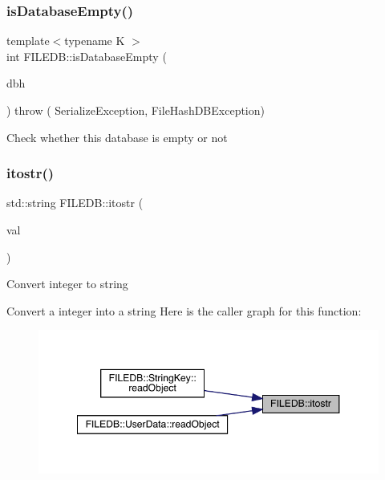 \subsubsection{\texorpdfstring{isDatabaseEmpty()}{isDatabaseEmpty()}}
{\footnotesize\ttfamily template$<$typename K $>$ \\
int F\+I\+L\+E\+D\+B\+::is\+Database\+Empty (\begin{DoxyParamCaption}\item[{\mbox{\hyperlink{adat-devel_2other__libs_2filedb_2filehash_2ffdb__db_8h_a0b27b956926453a7a8141ea8e10f0df8}{F\+F\+D\+B\+\_\+\+DB}} $\ast$}]{dbh }\end{DoxyParamCaption}) throw ( Serialize\+Exception, File\+Hash\+D\+B\+Exception) }

Check whether this database is empty or not \mbox{\label{namespaceFILEDB_a00ba2326eea8f8eb8dc3b4be5eac2bf3}} 
\subsubsection{\texorpdfstring{itostr()}{itostr()}}
{\footnotesize\ttfamily std\+::string F\+I\+L\+E\+D\+B\+::itostr (\begin{DoxyParamCaption}\item[{int}]{val }\end{DoxyParamCaption})}

Convert integer to string

Convert a integer into a string Here is the caller graph for this function\+:
\nopagebreak
\begin{figure}[H]
\begin{center}
\leavevmode
\includegraphics[width=348pt]{d2/de6/namespaceFILEDB_a00ba2326eea8f8eb8dc3b4be5eac2bf3_icgraph}
\end{center}
\end{figure}
\mbox{\label{namespaceFILEDB_a3533131675008d2c3b9b3d1685b2e679}} 
